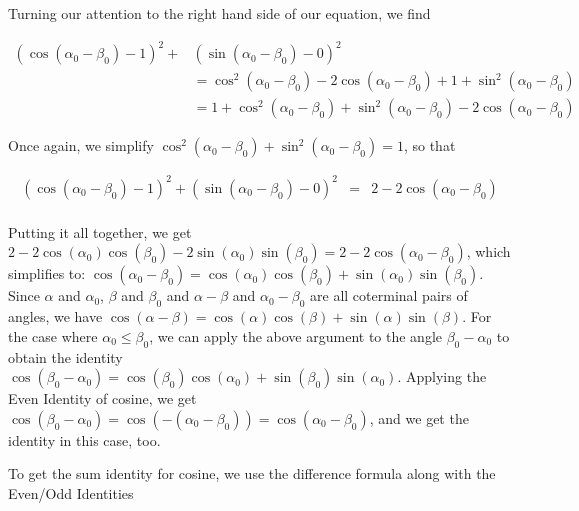 
Turning our attention to the right hand side of our equation, we find

\begin{align*}
(\cos(\alpha_{0} - \beta_{0}) - 1)^2 + & (\sin(\alpha_{0} - \beta_{0}) - 0)^2 \\
& =  \cos^2(\alpha_{0} - \beta_{0}) - 2\cos(\alpha_{0} - \beta_{0}) + 1 + \sin^2(\alpha_{0} - \beta_{0}) \\ 
& =  1 +  \cos^2(\alpha_{0} - \beta_{0}) + \sin^2(\alpha_{0} - \beta_{0}) - 2\cos(\alpha_{0} - \beta_{0}) 
\end{align*}

Once again, we simplify $\cos^2(\alpha_{0} - \beta_{0}) + \sin^2(\alpha_{0} - \beta_{0})= 1$, so that

\[ \begin{array}{rcl}
(\cos(\alpha_{0} - \beta_{0}) - 1)^2 + (\sin(\alpha_{0} - \beta_{0}) - 0)^2 & = & 2  - 2\cos(\alpha_{0} - \beta_{0}) \\ \end{array} \]

Putting it all together, we get $2  - 2\cos(\alpha_{0})\cos(\beta_{0}) - 2\sin(\alpha_{0})\sin(\beta_{0}) = 2  - 2\cos(\alpha_{0} - \beta_{0})$, which simplifies to: $\cos(\alpha_{0} - \beta_{0}) = \cos(\alpha_{0})\cos(\beta_{0}) + \sin(\alpha_{0})\sin(\beta_{0})$.  Since $\alpha$ and $\alpha_{0}$, $\beta$ and $\beta_{0}$ and $\alpha - \beta$ and $\alpha_{0}- \beta_{0}$ are all coterminal pairs of angles, we have $\cos(\alpha - \beta) = \cos(\alpha) \cos(\beta) + \sin(\alpha) \sin(\beta)$.  For the case where $\alpha_{0} \leq \beta_{0}$, we can apply the above argument to the angle $\beta_{0} - \alpha_{0}$ to obtain the identity  $\cos(\beta_{0} - \alpha_{0}) = \cos(\beta_{0})\cos(\alpha_{0}) + \sin(\beta_{0})\sin(\alpha_{0})$.  Applying the Even Identity of cosine, we get $\cos(\beta_{0} - \alpha_{0}) = \cos( - (\alpha_{0} - \beta_{0})) = \cos(\alpha_{0} - \beta_{0})$, and we get the identity in this case, too.   

\medskip

To get the sum identity for cosine, we use the difference formula along with the Even/Odd Identities

